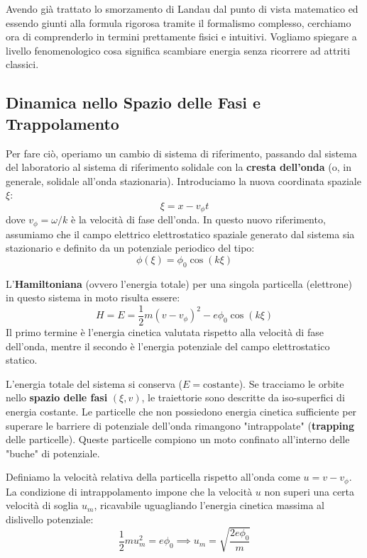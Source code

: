 Avendo già trattato lo smorzamento di Landau dal punto di vista matematico ed essendo giunti alla formula rigorosa tramite il formalismo complesso, cerchiamo ora di comprenderlo in termini prettamente fisici e intuitivi. Vogliamo spiegare a livello fenomenologico cosa significa scambiare energia senza ricorrere ad attriti classici.

\subsection{Dinamica nello Spazio delle Fasi e Trappolamento}
Per fare ciò, operiamo un cambio di sistema di riferimento, passando dal sistema del laboratorio al sistema di riferimento solidale con la \textbf{cresta dell'onda} (o, in generale, solidale all'onda stazionaria). Introduciamo la nuova coordinata spaziale $\xi$:
\begin{equation}
\xi = x - v_\phi t
\end{equation}
dove $v_\phi = \omega/k$ è la velocità di fase dell'onda. In questo nuovo riferimento, assumiamo che il campo elettrico elettrostatico spaziale generato dal sistema sia stazionario e definito da un potenziale periodico del tipo:
\begin{equation}
\phi(\xi) = \phi_0 \cos(k\xi)
\end{equation}

L'\textbf{Hamiltoniana} (ovvero l'energia totale) per una singola particella (elettrone) in questo sistema in moto risulta essere:
\begin{equation}
H = E = \frac{1}{2} m (v - v_\phi)^2 - e \phi_0 \cos(k\xi)
\end{equation}
Il primo termine è l'energia cinetica valutata rispetto alla velocità di fase dell'onda, mentre il secondo è l'energia potenziale del campo elettrostatico statico.

L'energia totale del sistema si conserva ($E = \text{costante}$). Se tracciamo le orbite nello \textbf{spazio delle fasi} $(\xi, v)$, le traiettorie sono descritte da iso-superfici di energia costante.
Le particelle che non possiedono energia cinetica sufficiente per superare le barriere di potenziale dell'onda rimangono "intrappolate" (\textbf{trapping} delle particelle). Queste particelle compiono un moto confinato all'interno delle "buche" di potenziale.

Definiamo la velocità relativa della particella rispetto all'onda come $u = v - v_\phi$. La condizione di intrappolamento impone che la velocità $u$ non superi una certa velocità di soglia $u_m$, ricavabile uguagliando l'energia cinetica massima al dislivello potenziale:
\begin{equation}
\frac{1}{2} m u_m^2 = e \phi_0 \implies u_m = \sqrt{\frac{2e\phi_0}{m}}
\end{equation}

